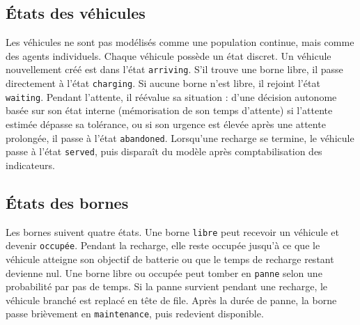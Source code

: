 \documentclass[11pt]{article}
\begin{document}
\subsection{États des véhicules}

Les véhicules ne sont pas modélisés comme une population continue, mais comme des agents individuels. Chaque véhicule possède un état discret. Un véhicule nouvellement créé est dans l'état \texttt{arriving}. S'il trouve une borne libre, il passe directement à l'état \texttt{charging}. Si aucune borne n'est libre, il rejoint l'état \texttt{waiting}. Pendant l'attente, il réévalue sa situation : d'une décision autonome basée sur son état interne (mémorisation de son temps d'attente) si l'attente estimée dépasse sa tolérance, ou si son urgence est élevée après une attente prolongée, il passe à l'état \texttt{abandoned}. Lorsqu'une recharge se termine, le véhicule passe à l'état \texttt{served}, puis disparaît du modèle après comptabilisation des indicateurs.

\subsection{États des bornes}

Les bornes suivent quatre états. Une borne \texttt{libre} peut recevoir un véhicule et devenir \texttt{occupée}. Pendant la recharge, elle reste occupée jusqu'à ce que le véhicule atteigne son objectif de batterie ou que le temps de recharge restant devienne nul. Une borne libre ou occupée peut tomber en \texttt{panne} selon une probabilité par pas de temps. Si la panne survient pendant une recharge, le véhicule branché est replacé en tête de file. Après la durée de panne, la borne passe brièvement en \texttt{maintenance}, puis redevient disponible.
\end{document}
